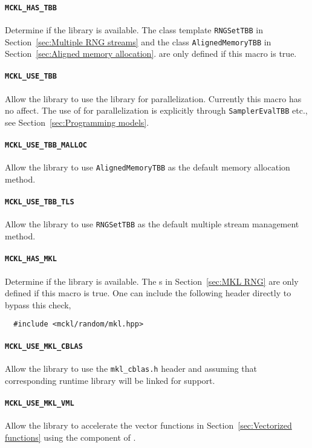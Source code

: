 \paragraph{\texttt{MCKL\_HAS\_TBB}} Determine if the \tbb library is available.
The class template \verb|RNGSetTBB| in Section~\ref{sec:Multiple RNG streams}
and the class \verb|AlignedMemoryTBB| in Section~\ref{sec:Aligned memory
  allocation}. are only defined if this macro is true.

\paragraph{\texttt{MCKL\_USE\_TBB}} Allow the library to use the \tbb library
for parallelization. Currently this macro has no affect. The use of \tbb for
parallelization is explicitly through \verb|SamplerEvalTBB| etc., see
Section~\ref{sec:Programming models}.

\paragraph{\texttt{MCKL\_USE\_TBB\_MALLOC}} Allow the library to use
\verb|AlignedMemoryTBB| as the default memory allocation method.

\paragraph{\texttt{MCKL\_USE\_TBB\_TLS}} Allow the library to use
\verb|RNGSetTBB| as the default multiple \rng stream management method.

\paragraph{\texttt{MCKL\_HAS\_MKL}} Determine if the \mkl library is available.
The \rng{}s in Section~\ref{sec:MKL RNG} are only defined if this macro is
true. One can include the following header directly to bypass this check,
\begin{Verbatim}
  #include <mckl/random/mkl.hpp>
\end{Verbatim}

\paragraph{\texttt{MCKL\_USE\_MKL\_CBLAS}} Allow the library to use the
\verb|mkl_cblas.h| header and assuming that corresponding runtime library will
be linked for \blas support.

\paragraph{\texttt{MCKL\_USE\_MKL\_VML}} Allow the library to accelerate the
vector functions in Section~\ref{sec:Vectorized functions} using the \vml
component of \mkl.

